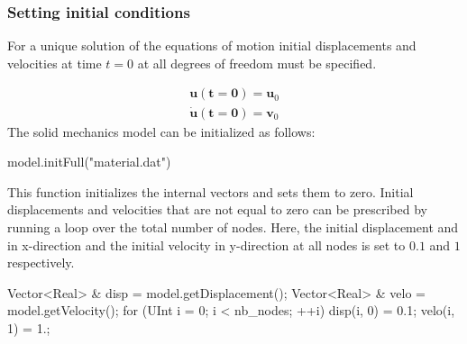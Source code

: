 \documentclass[a4paper,11pt]{book}
\renewcommand{\vec}[1]{\ensuremath{\boldsymbol{#1}}}
\begin{document}
\subsubsection{Setting   initial  conditions  \label{sect:smm:initial_condition}}

For  a unique  solution of  the equations  of motion  initial  displacements and
velocities at time $t=0$ at all degrees of freedom must be specified.

\begin{eqnarray}
 \vec{u(t=0)} = \vec{u}_{0}\\
 \vec{\dot u(t=0)} = \vec{v}_{0}
\end{eqnarray}
The solid mechanics model can be initialized as follows:
\begin{cpp}
  model.initFull("material.dat")
\end{cpp}
This function  initializes the internal vectors  and sets them  to zero. Initial
displacements and  velocities that are  not equal to  zero can be  prescribed by
running a  loop over the total  number of nodes. Here,  the initial displacement
and in x-direction  and the initial velocity in y-direction at  all nodes is set
to $0.1$ and $1$ respectively.
\begin{cpp}
  Vector<Real> & disp = model.getDisplacement();
  Vector<Real> & velo = model.getVelocity();
  for (UInt i = 0; i < nb_nodes; ++i) {
      disp(i, 0) = 0.1;
      velo(i, 1) = 1.;
  }
\end{cpp}
\end{document}
